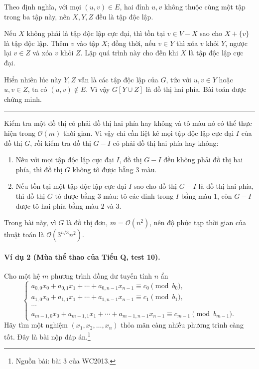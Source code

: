 \documentclass[11pt]{article}
\newcommand{\Oh}{\mathcal{O}}
\newcommand{\qedmark}{\hfill\rule{0.7ex}{0.7ex}}
\begin{document}
Theo định nghĩa, với mọi \((u,v)\in E\), hai đỉnh \(u,v\) không thuộc cùng một
tập trong ba tập này, nên \(X,Y,Z\) đều là tập độc lập.

Nếu \(X\) không phải là tập độc lập cực đại, thì tồn tại \(v\in V-X\) sao cho
\(X+\{v\}\) là tập độc lập. Thêm \(v\) vào tập \(X\); đồng thời, nếu \(v\in Y\)
thì xóa \(v\) khỏi \(Y\), ngược lại \(v\in Z\) và xóa \(v\) khỏi \(Z\). Lặp quá
trình này cho đến khi \(X\) là tập độc lập cực đại.

Hiển nhiên lúc này \(Y,Z\) vẫn là các tập độc lập của \(G\), tức với
\(u,v\in Y\) hoặc \(u,v\in Z\), ta có \((u,v)\notin E\). Vì vậy \(G[Y\cup Z]\)
là đồ thị hai phía. Bài toán được chứng minh. \qedmark

Kiểm tra một đồ thị có phải đồ thị hai phía hay không và tô màu nó có thể thực
hiện trong \(\Oh(m)\) thời gian. Vì vậy chỉ cần liệt kê mọi tập độc lập cực
đại \(I\) của đồ thị \(G\), rồi kiểm tra đồ thị \(G-I\) có phải đồ thị hai
phía hay không:

\begin{enumerate}
  \item Nếu với mọi tập độc lập cực đại \(I\), đồ thị \(G-I\) đều không phải
  đồ thị hai phía, thì đồ thị \(G\) không tô được bằng 3 màu.

  \item Nếu tồn tại một tập độc lập cực đại \(I\) sao cho đồ thị \(G-I\) là đồ
  thị hai phía, thì đồ thị \(G\) tô được bằng 3 màu: tô các đỉnh trong \(I\)
  bằng màu \(1\), còn \(G-I\) được tô hai phía bằng màu \(2\) và \(3\).
\end{enumerate}

Trong bài này, vì \(G\) là đồ thị đơn, \(m=\Oh(n^2)\), nên độ phức tạp thời
gian của thuật toán là \(\Oh(3^{n/3}n^2)\).

\paragraph{Ví dụ 2 (Mùa thể thao của Tiểu Q, test 10).}
Cho một hệ \(m\) phương trình đồng dư tuyến tính \(n\) ẩn
\[
\begin{cases}
a_{0,0}x_0+a_{0,1}x_1+\cdots+a_{0,n-1}x_{n-1}\equiv c_0\pmod {b_0},\\
a_{1,0}x_0+a_{1,1}x_1+\cdots+a_{1,n-1}x_{n-1}\equiv c_1\pmod {b_1},\\
\cdots\\
a_{m-1,0}x_0+a_{m-1,1}x_1+\cdots+a_{m-1,n-1}x_{n-1}
  \equiv c_{m-1}\pmod {b_{m-1}}.
\end{cases}
\]
Hãy tìm một nghiệm \((x_1,x_2,\ldots,x_n)\) thỏa mãn càng nhiều phương trình
càng tốt. Đây là bài nộp đáp án.\footnote{Nguồn bài: bài 3 của WC2013.}
\end{document}
